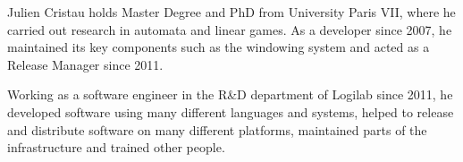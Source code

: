 \begin{participant}[type=PI,PM=10,gender=male]{Julien Cristau}
  holds Master Degree and PhD from University Paris VII, where he carried out
  research in automata and linear games. As a  developer since 2007, he
  maintained its key components such as the  windowing system and
  acted as a  Release Manager since 2011.
  
  Working as a software engineer in the R\&D department of Logilab since
  2011, he developed software using many different languages and systems,
  helped to release and distribute software on many different platforms,
  maintained parts of the infrastructure and trained other people.
\end{participant}
